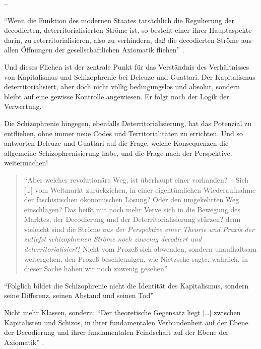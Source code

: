 \documentclass[12pt,
               DIV13,
               paper=a4,
               twoside=false,
               onehalfspacing,
               bibliography=totoc,
               toc=graduated,
               draft,
               ]{scrartcl}
\newcommand{\lips}{\dots\unkern}
\newcommand{\pc}[2]{\parencite[#1]{#2}}
\newcommand{\worries}[1]{\ifdraft{\textcolor{blue}{\texttt{(#1)}}}{}}
\begin{document}
--

"`Wenn die Funktion des modernen Staates tatsächlich die Regulierung
der decodierten, deterritorialisierten Ströme ist, so besteht einer
ihrer Hauptaspekte darin, zu reterritorialisieren, also zu verhindern,
daß die decodierten Ströme aus allen Öffnungen der gesellschaftlichen
Axiomatik fliehen"' \pc{332}{ao}.

Und dieses Fliehen ist der zentrale Punkt für das Verständnis des
Verhältnisses von Kapitalismus und Schizophrenie \worries{?} bei
Deleuze und Guattari. Der Kapitalismus deterritorialisiert, aber doch
nicht völlig bedingungslos und absolut, sondern bleibt auf eine gewisse
Kontrolle angewiesen. Er folgt noch der Logik der Verwertung.

Die Schizophrenie hingegen, ebenfalls Deterritorialisierung, hat das
Potenzial zu entfliehen, ohne immer neue Codes und Territorialitäten
zu errichten. Und so antworten Deleuze und Guattari auf die Frage,
welche Konsequenzen die allgemeine Schizophrenisierung habe, und die
Frage nach der Perspektive: weitermachen!
%
\begin{spacing}{1}
\begin{quote}
"`Aber welcher revolutionäre Weg, ist überhaupt einer vorhanden? -- Sich
[\lips] vom Weltmarkt zurückziehen, in einer eigentümlichen
Wiederaufnahme der faschistischen \glq ökonomischen Lösung\grq? Oder
den umgekehrten Weg einschlagen? Das heißt mit noch mehr Verve sich in
die Bewegung des Marktes, der Decodierung und der
Deterritorialisierung stürzen? denn vieleicht sind die Ströme
\emph{aus der Perspektive einer Theorie und Praxis der zutiefst
schizophrenen Ströme noch zuwenig decodiert und deterritorialisiert}?
Nicht vom Prozeß sich abwenden, sondern unaufhaltsam weitergehen, \glq
den Prozeß beschleunigen\grq, wie Nietzsche sagte: wahrlich, in dieser
Sache haben wir noch zuwenig gesehen"' \pc{S. 308, meine Hervorh.}{ao}
\worries{Ende doch eine Relativierung? also raus?}
\end{quote}
\end{spacing}

"`Folglich bildet die Schizophrenie nicht die Identität des
Kapitalismus, sondern seine Differenz, seinen Abstand und seinen Tod"'
\pc{317}{ao}

Nicht mehr Klassen, sondern: "`Der theoretische Gegensatz liegt
[\lips] zwischen Kapitalisten und Schizos, in ihrer fundamentalen
Verbundenheit auf der Ebene der Decodierung und ihrer fundamentalen
Feindschaft auf der Ebene der Axiomatik"' \pc{328}{ao}.
\end{document}
